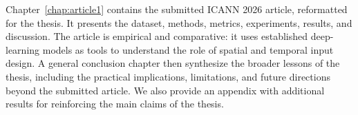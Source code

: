 Chapter~\ref{chap:article1} contains the submitted ICANN 2026 article, reformatted for the thesis. It presents the dataset, methods, metrics, experiments, results, and discussion. The article is empirical and comparative: it uses established deep-learning models as tools to understand the role of spatial and temporal input design. A general conclusion chapter then synthesize the broader lessons of the thesis, including the practical implications, limitations, and future directions beyond the submitted article.
We also provide an appendix with additional results for reinforcing the main claims of the thesis.

\endinput
